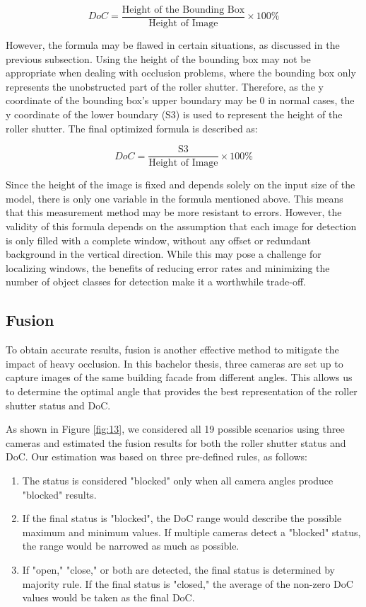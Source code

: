 $$ DoC = \frac{\text{Height of the Bounding Box}}{\text{Height of Image}} \times 100\%
$$

However, the formula may be flawed in certain situations, as discussed in the previous subsection. Using the height of the bounding box may not be appropriate when dealing with occlusion problems, where the bounding box only represents the unobstructed part of the roller shutter. Therefore, as the y coordinate of the bounding box's upper boundary may be 0 in normal cases, the y coordinate of the lower boundary (S3) is used to represent the height of the roller shutter. The final optimized formula is described as: 

$$ DoC = \frac{\text{S3}}{\text{Height of Image}} \times 100\%
$$

Since the height of the image is fixed and depends solely on the input size of the model, there is only one variable in the formula mentioned above. This means that this measurement method may be more resistant to errors. However, the validity of this formula depends on the assumption that each image for detection is only filled with a complete window, without any offset or redundant background in the vertical direction. While this may pose a challenge for localizing windows, the benefits of reducing error rates and minimizing the number of object classes for detection make it a worthwhile trade-off.

\subsection{Fusion}

To obtain accurate results, fusion is another effective method to mitigate the impact of heavy occlusion. In this bachelor thesis, three cameras are set up to capture images of the same building facade from different angles. This allows us to determine the optimal angle that provides the best representation of the roller shutter status and DoC.

As shown in Figure \ref{fig:13}, we considered all 19 possible scenarios using three cameras and estimated the fusion results for both the roller shutter status and DoC. Our estimation was based on three pre-defined rules, as follows:

\begin{enumerate}
\item The status is considered "blocked" only when all camera angles produce "blocked" results.
\item If the final status is "blocked", the DoC range would describe the possible maximum and minimum values. If multiple cameras detect a "blocked" status, the range would be narrowed as much as possible.
\item If "open," "close," or both are detected, the final status is determined by majority rule. If the final status is "closed," the average of the non-zero DoC values would be taken as the final DoC.
\end{enumerate}

